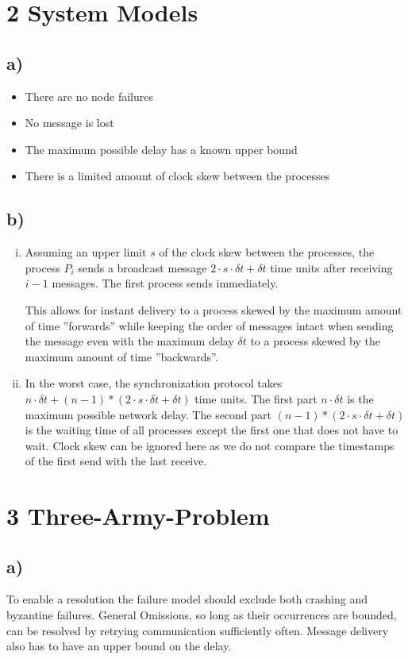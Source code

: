 \documentclass{scrartcl}
\begin{document}
\section*{2 System Models}
\subsection*{a)}
\begin{itemize}
	\item There are no node failures
	\item No message is lost
	\item The maximum possible delay has a known upper bound
	\item There is a limited amount of clock skew between the processes
\end{itemize}
\subsection*{b)}
\begin{enumerate}[i.]
	\item Assuming an upper limit \(s\) of the clock skew between the processes, the process \(P_i\) sends a broadcast message \(2 \cdot s \cdot \delta t + \delta t\) time units after receiving \(i - 1\) messages.
		The first process sends immediately.

		This allows for instant delivery to a process skewed by the maximum amount of time ''forwards'' while keeping the order of messages intact when sending the message even with the maximum delay \(\delta t\) to a process skewed by the maximum amount of time ''backwards''.
	\item In the worst case, the synchronization protocol takes \(n \cdot \delta t + (n-1)*(2 \cdot s \cdot \delta t + \delta t)\) time units.
		The first part \(n \cdot \delta t\) is the maximum possible network delay.
		The second part \((n-1)*(2 \cdot s \cdot \delta t + \delta t)\) is the waiting time of all processes except the first one that does not have to wait.
		Clock skew can be ignored here as we do not compare the timestamps of the first send with the last receive.
\end{enumerate}

\section*{3 Three-Army-Problem}
\subsection*{a)}
To enable a resolution the failure model should exclude both crashing and byzantine failures.
General Omissions, so long as their occurrences are bounded, can be resolved by retrying communication sufficiently often.
Message delivery also has to have an upper bound on the delay.
\end{document}
